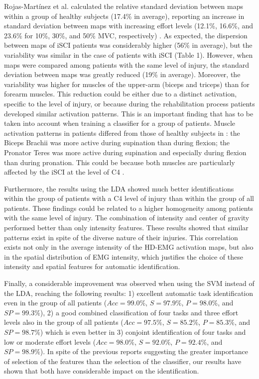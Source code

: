 Rojas-Martínez et al. calculated the relative standard deviation between maps within a group of healthy subjects (17.4\% in average), reporting an increase in standard deviation between maps with increasing effort levels (12.1\%, 16.6\%, and 23.6\% for 10\%, 30\%, and 50\% MVC, respectively) \citep{Rojas-Martinez2012}. As expected, the dispersion between maps of iSCI patients was considerably higher (56\% in average), but the variability was similar in the case of patients with iSCI (Table 1). However, when maps were compared among patients with the same level of injury, the standard deviation between maps was greatly reduced (19\% in average). Moreover, the variability was higher for muscles of the upper-arm (biceps and triceps) than for forearm muscles. This reduction could be either due to a distinct activation, specific to the level of injury, or because during the rehabilitation process patients developed similar activation patterns. This is an important finding that has to be taken into account when training a classifier for a group of patients. Muscle activation patterns in patients differed from those of healthy subjects in \citep{Rojas-Martinez2012}: the Biceps Brachii was more active during supination than during flexion; the Pronator Teres was more active during supination and especially during flexion than during pronation. This could be because both muscles are particularly affected by the iSCI at the level of C4 \citep{Young-SCI}.

Furthermore, the results using the LDA showed much better identifications within the group of patients with a C4 level of injury than within the group of all patients. These findings could be related to a higher homogeneity among patients with the same level of injury. The combination of intensity and center of gravity performed better than only intensity features. These results showed that similar patterns exist in spite of the diverse nature of their injuries. This correlation exists not only in the average intensity of the HD-EMG activation maps, but also in the spatial distribution of EMG intensity, which justifies the choice of these intensity and spatial features for automatic identification.

Finally, a considerable improvement was observed when using the SVM instead of the LDA, reaching the following results: 1) excellent automatic task identification even in the group of all patients ($Acc=99.0\%$, $S=97.9\%$, $P=98.0\%$, and $SP=99.3\%$), 2) a good combined classification of four tasks and three effort levels also in the group of all patients ($Acc=97.5\%$, $S=85.2\%$, $P=85.3\%$, and $SP=98.7\%$) which is even better in 3) conjoint identification of four tasks and low or moderate effort levels ($Acc=98.0\%$, $S=92.0\%$, $P=92.4\%$, and $SP=98.9\%$). In spite of the previous reports suggesting the greater importance of selection of the features than the selection of the classifier, our results have shown that both have considerable impact on the identification.

